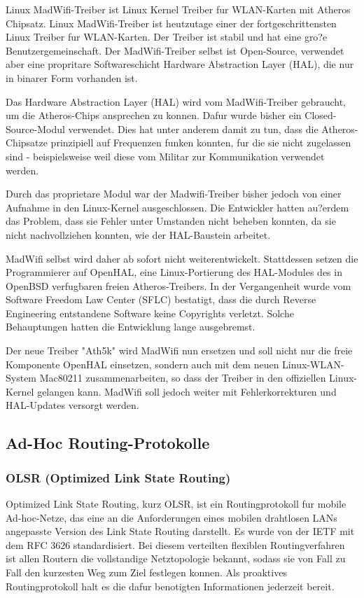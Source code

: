 Linux MadWifi-Treiber ist Linux Kernel Treiber fur WLAN-Karten mit
Atheros Chipsatz. Linux MadWifi-Treiber ist heutzutage einer der
fortgeschrittensten Linux Treiber fur WLAN-Karten. Der Treiber ist
stabil und hat eine gro?e Benutzergemeinschaft. Der MadWifi-Treiber
selbst ist Open-Source, verwendet aber eine propritare Softwareschicht
Hardware Abstraction Layer (HAL), die nur in binarer Form vorhanden
ist. 
 
 Das Hardware Abstraction Layer (HAL) wird vom MadWifi-Treiber
gebraucht, um die Atheros-Chips ansprechen zu konnen. Dafur wurde bisher
ein Closed-Source-Modul verwendet. Dies hat unter anderem damit zu tun,
dass die Atheros-Chipsatze prinzipiell auf Frequenzen funken konnten,
fur die sie nicht zugelassen sind - beispielsweise weil diese vom
Militar zur Kommunikation verwendet werden. 
 
 Durch das proprietare
Modul war der Madwifi-Treiber bisher jedoch von einer Aufnahme in den
Linux-Kernel ausgeschlossen. Die Entwickler hatten au?erdem das Problem,
dass sie Fehler unter Umstanden nicht beheben konnten, da sie nicht
nachvollziehen konnten, wie der HAL-Baustein arbeitet. 
 
 MadWifi
selbst wird daher ab sofort nicht weiterentwickelt. Stattdessen
setzen die Programmierer auf OpenHAL, eine Linux-Portierung des
HAL-Modules des in OpenBSD verfugbaren freien Atheros-Treibers. In der
Vergangenheit wurde vom Software Freedom Law Center (SFLC) bestatigt,
dass die durch Reverse Engineering entstandene Software keine Copyrights
verletzt. Solche Behauptungen hatten die Entwicklung lange ausgebremst. 


 Der neue Treiber "Ath5k" wird MadWifi nun ersetzen und soll nicht
nur die freie Komponente OpenHAL einsetzen, sondern auch mit dem neuen
Linux-WLAN-System Mac80211 zusammenarbeiten, so dass der Treiber in den
offiziellen Linux-Kernel gelangen kann. MadWifi soll jedoch weiter mit
Fehlerkorrekturen und HAL-Updates versorgt werden. 


\subsection{Ad-Hoc Routing-Protokolle}

\subsubsection{OLSR (Optimized Link State Routing)}

Optimized Link State Routing, kurz OLSR, ist ein Routingprotokoll
fur mobile Ad-hoc-Netze, das eine an die Anforderungen eines mobilen
drahtlosen LANs angepasste Version des Link State Routing darstellt. Es
wurde von der IETF mit dem RFC 3626 standardisiert. Bei diesem
verteilten flexiblen Routingverfahren ist allen Routern die vollstandige
Netztopologie bekannt, sodass sie von Fall zu Fall den kurzesten Weg zum
Ziel festlegen konnen. Als proaktives Routingprotokoll halt es die dafur
benotigten Informationen jederzeit bereit. 
 
